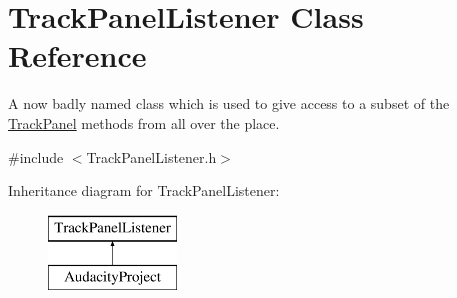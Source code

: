\hypertarget{class_track_panel_listener}{}\section{Track\+Panel\+Listener Class Reference}
\label{class_track_panel_listener}


A now badly named class which is used to give access to a subset of the \hyperlink{class_track_panel}{Track\+Panel} methods from all over the place.  




{\ttfamily \#include $<$Track\+Panel\+Listener.\+h$>$}

Inheritance diagram for Track\+Panel\+Listener\+:\begin{figure}[H]
\begin{center}
\leavevmode
\includegraphics[height=2.000000cm]{class_track_panel_listener}
\end{center}
\end{figure}
